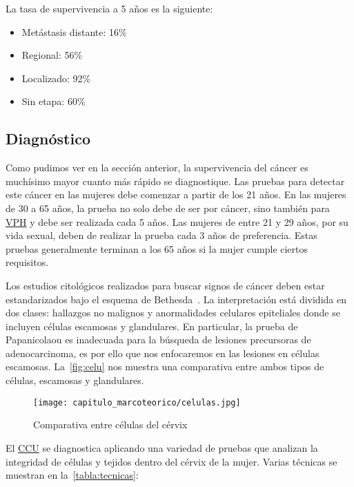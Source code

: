 La tasa de supervivencia a 5 años es la siguiente:

\begin{itemize}
    \item Metástasis distante: 16\%
    \item Regional: 56\%
    \item Localizado: 92\%
    \item Sin etapa: 60\%
\end{itemize}

\subsection{Diagnóstico}

Como pudimos ver en la sección anterior, la supervivencia del cáncer es
muchísimo mayor cuanto más rápido se diagnostique. Las pruebas para detectar
este cáncer en las mujeres debe comenzar a partir de los 21 años. En las mujeres
de 30 a 65 años, la prueba no solo debe de ser por cáncer, sino también para
\hyperlink{abbr}{VPH} y debe ser realizada cada 5 años. Las mujeres de entre 21
y 29 años, por su vida sexual, deben de realizar la prueba cada 3 años de
preferencia. Estas pruebas generalmente terminan a los 65 años si la mujer
cumple ciertos requisitos.

Los estudios citológicos realizados para buscar signos de cáncer deben estar
estandarizados bajo el esquema de Bethesda~\cite{Kurman1995}. La interpretación
está dividida en dos clases: hallazgos no malignos y anormalidades celulares
epiteliales donde se incluyen células escamosas y glandulares. En particular, la
prueba de Papanicolaou es inadecuada para la búsqueda de lesiones precursoras de
adenocarcinoma, es por ello que nos enfocaremos en las lesiones en células
escamosas. La~\autoref{fig:celu} nos muestra una comparativa entre ambos tipos
de células, escamosas y glandulares. 


\begin{figure}[H]
    \centering
    \texttt{[image: capitulo\_marcoteorico/celulas.jpg]}
    \caption{Comparativa entre células del cérvix}\label{fig:celu}
\end{figure}

El \hyperlink{abbr}{CCU} se diagnostica aplicando una variedad de pruebas que
analizan la integridad de células y tejidos dentro del cérvix de la mujer.
Varias técnicas se muestran en la~\autoref{tabla:tecnicas}:

